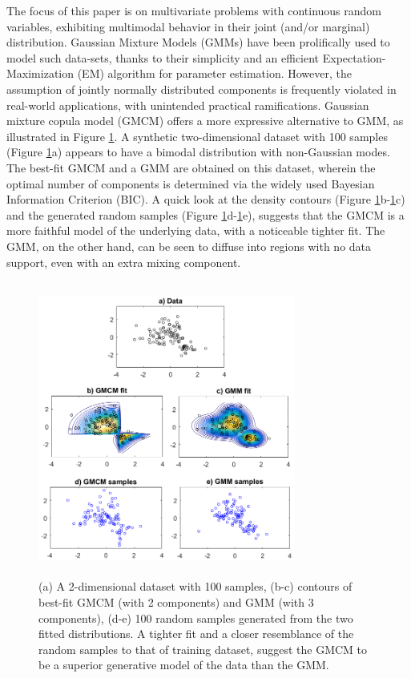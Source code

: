 \documentclass{article}
\begin{document}
The focus of this paper is on multivariate problems with continuous random variables, exhibiting multimodal behavior in their  joint (and/or marginal) distribution. Gaussian Mixture Models (GMMs) \citep{Bilmes98agentle} have been prolifically used to model such data-sets, thanks to their simplicity and an efficient Expectation-Maximization (EM) algorithm for parameter estimation. However, the assumption of jointly normally distributed components is frequently violated in real-world applications, with unintended practical ramifications. Gaussian mixture copula model (GMCM) \citep{Tewari2011,Bilgrau2016,Bhattacharya2014} offers a more expressive alternative to GMM, as illustrated in Figure \ref{fig:motivating_example_gmcm}. A synthetic two-dimensional dataset with 100 samples (Figure \ref{fig:motivating_example_gmcm}a) appears to have a bimodal distribution with non-Gaussian modes. The best-fit GMCM and a GMM are obtained on this dataset, wherein the optimal number of components is determined via the widely used Bayesian Information Criterion (BIC). A quick look at the density contours (Figure \ref{fig:motivating_example_gmcm}b-\ref{fig:motivating_example_gmcm}c) and the generated random samples (Figure \ref{fig:motivating_example_gmcm}d-\ref{fig:motivating_example_gmcm}e), suggests that the GMCM is a more faithful model of the underlying data, with a noticeable tighter fit. The GMM, on the other hand, can be seen to diffuse into regions with no data support, even with an extra mixing component.

\begin{figure}[ht]
\centering
\includegraphics[width= 240pt,height=275pt]{figures/figure_for_motivating_gmcm}
\caption{(a) A 2-dimensional dataset with 100 samples, (b-c) contours of best-fit GMCM (with 2 components) and GMM (with 3 components), (d-e) 100 random samples generated from the two fitted distributions. A tighter fit and a closer resemblance of the random samples to that of training dataset, suggest the GMCM to be a superior generative model of the data than the GMM.}
\label{fig:motivating_example_gmcm}
\end{figure}
\end{document}
